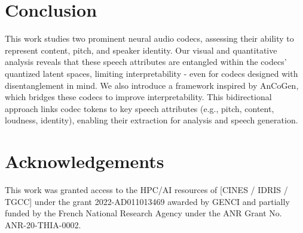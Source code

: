 \documentclass{Interspeech}
\begin{document}
\section{Conclusion}
This work studies two prominent neural audio codecs, assessing their ability to represent content, pitch, and speaker identity. Our visual and quantitative analysis reveals that these speech attributes are entangled within the codecs' quantized latent spaces, limiting interpretability - even for codecs designed with disentanglement in mind. We also introduce a framework inspired by AnCoGen, which bridges these codecs to improve interpretability. This bidirectional approach links codec tokens to key speech attributes (e.g., pitch, content, loudness, identity), enabling their extraction for analysis and speech generation.

\section{Acknowledgements}

This work was granted access to the HPC/AI resources of [CINES / IDRIS / TGCC] under the grant 2022-AD011013469 awarded by GENCI and partially funded by the French National Research Agency under the ANR Grant No. ANR-20-THIA-0002.




\end{document}
